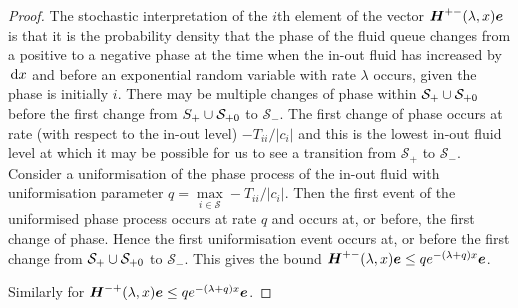 \begin{proof}
        The stochastic interpretation of the \(i\)th element of the vector \(\boldsymbol H^{+-}(\lambda,x)\boldsymbol e\) is that it is the probability density that the phase of the fluid queue changes from a positive to a negative phase at the time when the in-out fluid has increased by \(\, \mathrm{d} x\) and before an exponential random variable with rate \(\lambda\) occurs, given the phase is initially \(i\). There may be multiple changes of phase within \(\mathcal S_+\cup\mathcal{S}_{+0}\) before the first change from \(\mathcal \mathcal S_+\cup\mathcal{S}_{+0}\) to \(\mathcal S_-\). The first change of phase occurs at rate (with respect to the in-out level) \(-T_{ii}/|c_i|\) and this is the lowest in-out fluid level at which it may be possible for us to see a transition from \(\mathcal S_+\) to \(\mathcal S_-\). Consider a uniformisation of the phase process of the in-out fluid with uniformisation parameter \(q = \max\limits_{i\in\mathcal S}-T_{ii}/|c_i|\). Then the first event of the uniformised phase process occurs at rate \(q\) and occurs at, or before, the first change of phase. Hence the first uniformisation event occurs at, or before the first change from \(\mathcal S_+\cup\mathcal{S}_{+0}\) to \(\mathcal S_-\). This gives the bound \(\boldsymbol H^{+-}(\lambda,x)\boldsymbol e\leq qe^{-(\lambda + q)x}\boldsymbol e\).
        
        Similarly for \(\boldsymbol H^{-+}(\lambda,x)\boldsymbol e\leq qe^{-(\lambda + q)x}\boldsymbol e\).
        

\end{proof}
